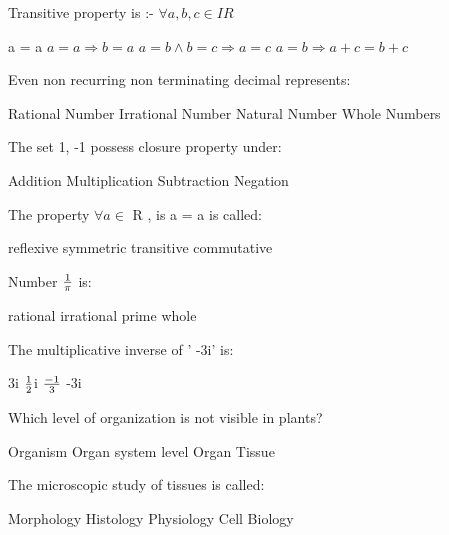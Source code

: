 \documentclass{exam}
\begin{document}
\begin{questions}
Transitive property is :- \(\forall a,b,c \in IR\)\\
\begin{oneparchoices}
\choice a = a
\choice \( a = a \Rightarrow  b= a \)
\choice \( a = b  \land b= c\Rightarrow  a = c\)
\choice \(a =  b \Rightarrow a + c = b + c \)
\end{oneparchoices}
\question 

Even non recurring non terminating decimal represents:\\
\begin{oneparchoices}
\choice Rational Number
\choice Irrational Number
\choice Natural Number
\choice Whole Numbers
\end{oneparchoices}
\question 

The set { 1, -1} possess closure property under:\\
\begin{oneparchoices}
\choice Addition
\choice Multiplication
\choice Subtraction
\choice Negation
\end{oneparchoices}
\question 

The property \(\forall a  \in \) R , is a = a is called:\\
\begin{oneparchoices}
\choice reflexive
\choice symmetric
\choice transitive
\choice commutative
\end{oneparchoices}
\question 

Number \(1\over\pi\) is:\\
\begin{oneparchoices}
\choice rational
\choice irrational
\choice prime
\choice whole
\end{oneparchoices}
\question 

The multiplicative inverse of ' -3i' is:\\
\begin{oneparchoices}
\choice 3i
\choice \(1\over2\)i
\choice \(-1\over3\)
\choice -3i
\end{oneparchoices}
\question 

Which level of organization is not visible in plants?\\
\begin{oneparchoices}
\choice Organism
\choice Organ system level
\choice Organ
\choice Tissue
\end{oneparchoices}
\question 

The microscopic study of tissues is called:\\
\begin{oneparchoices}
\choice Morphology
\choice Histology
\choice Physiology
\choice Cell Biology
\end{oneparchoices}
\question 


\end{questions}
\end{document}
